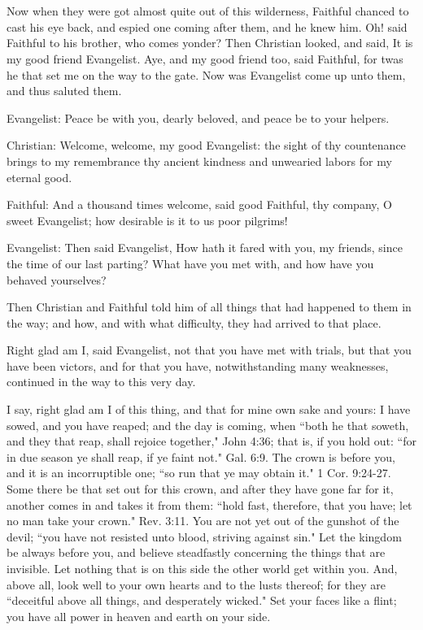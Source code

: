 \chapter[THE SIXTH STAGE]{}

Now when they were got almost quite out of this wilderness, Faithful chanced to cast his eye back, and espied one coming after them, and he knew him. Oh! said Faithful to his brother, who comes yonder? Then Christian looked, and said, It is my good friend Evangelist. Aye, and my good friend too, said Faithful, for twas he that set me on the way to the gate. Now was Evangelist come up unto them, and thus saluted them.

Evangelist: Peace be with you, dearly beloved, and peace be to your helpers.

Christian: Welcome, welcome, my good Evangelist: the sight of thy countenance brings to my remembrance thy ancient kindness and unwearied labors for my eternal good.

Faithful: And a thousand times welcome, said good Faithful, thy company, O sweet Evangelist; how desirable is it to us poor pilgrims!

Evangelist: Then said Evangelist, How hath it fared with you, my friends, since the time of our last parting? What have you met with, and how have you behaved yourselves?

Then Christian and Faithful told him of all things that had happened to them in the way; and how, and with what difficulty, they had arrived to that place.

Right glad am I, said Evangelist, not that you have met with trials, but that you have been victors, and for that you have, notwithstanding many weaknesses, continued in the way to this very day.

I say, right glad am I of this thing, and that for mine own sake and yours: I have sowed, and you have reaped; and the day is coming, when ``both he that soweth, and they that reap, shall rejoice together," John 4:36; that is, if you hold out: ``for in due season ye shall reap, if ye faint not." Gal. 6:9. The crown is before you, and it is an incorruptible one; ``so run that ye may obtain it." 1 Cor. 9:24-27. Some there be that set out for this crown, and after they have gone far for it, another comes in and takes it from them: ``hold fast, therefore, that you have; let no man take your crown." Rev. 3:11. You are not yet out of the gunshot of the devil; ``you have not resisted unto blood, striving against sin." Let the kingdom be always before you, and believe steadfastly concerning the things that are invisible. Let nothing that is on this side the other world get within you. And, above all, look well to your own hearts and to the lusts thereof; for they are ``deceitful above all things, and desperately wicked." Set your faces like a flint; you have all power in heaven and earth on your side.

